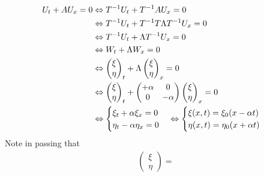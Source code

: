 \documentclass[12pt]{article}
\begin{document}
\begin{enumerate}
	      \begin{align}\label{eq:system4}
		      U_{t} + AU_{x} = 0 
		       & \Leftrightarrow
		      T^{-1}U_{t} + T^{-1}AU_{x} = 0\notag               \\
		       & \Leftrightarrow
		      T^{-1}U_{t} + T^{-1}T\Lambda T^{-1}U_{x} = 0\notag \\
		       & \Leftrightarrow
		      T^{-1}U_{t} + \Lambda T^{-1}U_{x} = 0\notag        \\
		       & \Leftrightarrow
		      W_{t} + \Lambda W_{x} = 0\notag                    \\
		       & \Leftrightarrow
		      \begin{pmatrix} \xi \\ \eta \end{pmatrix}_{t}
		      + \Lambda
		      \begin{pmatrix} \xi \\ \eta \end{pmatrix}_{x}
		      = 0 \notag                                         \\
		       & \Leftrightarrow
		      \begin{pmatrix} \xi \\ \eta \end{pmatrix}_{t}
		      + 
		      \begin{pmatrix} +\alpha &0 \\ 0&-\alpha\end{pmatrix}
		      \begin{pmatrix} \xi \\ \eta \end{pmatrix}_{x}
		      = 0 \notag                                         \\
		       & \Leftrightarrow
		      \begin{cases}
			      \xi_{t} + \alpha\xi_{x} = 0   \\
			      \eta_{t} - \alpha\eta_{x} = 0 \\
		      \end{cases}
		      \Leftrightarrow
		      \begin{cases}
			      \xi(x,t) = \xi_{0}(x-\alpha t)   \\
			      \eta(x,t) = \eta_{0}(x+\alpha t) \\
		      \end{cases}
	      \end{align}
	      Note in passing that 
	      \begin{align}
		      \begin{pmatrix} \xi \\ \eta \end{pmatrix} =   

\end{align}
\end{enumerate}
\end{document}
